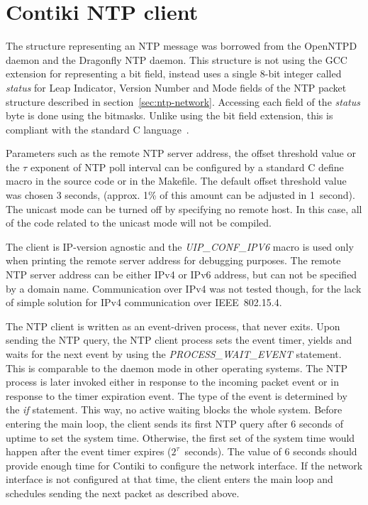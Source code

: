 \newpage
\section{Contiki NTP client}
The structure representing an NTP message was borrowed from the OpenNTPD daemon
and the Dragonfly NTP daemon.
This structure is not using the GCC extension for representing a bit field,
instead uses a single 8-bit integer called {\it{status}}
for Leap Indicator, Version Number and Mode fields of the NTP packet
structure described in section~\ref{sec:ntp-network}.
Accessing each field of the {\it{status}} byte is done using the bitmasks.
Unlike using the bit field extension,
this is compliant with the standard C language~\cite{c99}.

Parameters such as the remote NTP server address, the offset threshold value
or the $\tau$ exponent of NTP poll interval can be configured by a standard C define macro
in the source code or in the Makefile.
The default offset threshold value was chosen 3 seconds,
(approx. 1\% of this amount can be adjusted in 1~second).
The unicast mode can be turned off by specifying no remote host.
In this case, all of the code related to the unicast mode will not be compiled.

The client is IP-version agnostic and the {\it{UIP\_CONF\_IPV6}} macro is used only
when printing the remote server address for debugging purposes.
The remote NTP server address can be either IPv4 or IPv6 address,
but can not be specified by a domain name.
Communication over IPv4 was not tested though, for the lack of simple solution for
IPv4 communication over IEEE~802.15.4.

The NTP client is written as an event-driven process, that never exits.
Upon sending the NTP query, the NTP client process sets the event timer,
yields and waits for the next event by using the {\it{PROCESS\_WAIT\_EVENT}} statement.
This is comparable to the daemon mode in other operating systems.
The NTP process is later invoked either in response to the incoming packet event
or in response to the timer expiration event.
The type of the event is determined by the {\it{if}} statement.
This way, no active waiting blocks the whole system.
Before entering the main loop, the client sends
its first NTP query after 6 seconds of uptime to set the system time.
Otherwise, the first set of the system time would happen
after the event timer expires ($2^{\tau}$~seconds).
The value of 6 seconds should provide enough time for Contiki to
configure the network interface.
If the network interface is not configured at that time,
the client enters the main loop and schedules sending the next packet as described above.

